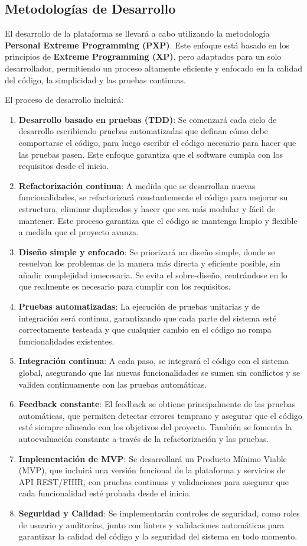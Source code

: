 \documentclass{article}
\begin{document}
\subsection{Metodologías de Desarrollo}
El desarrollo de la plataforma se llevará a cabo utilizando la metodología \textbf{Personal Extreme Programming (PXP)}. Este enfoque está basado en los principios de \textbf{Extreme Programming (XP)}, pero adaptados para un solo desarrollador, permitiendo un proceso altamente eficiente y enfocado en la calidad del código, la simplicidad y las pruebas continuas.

El proceso de desarrollo incluirá:
\begin{enumerate}[leftmargin=1.2em]
  \item \textbf{Desarrollo basado en pruebas (TDD)}: Se comenzará cada ciclo de desarrollo escribiendo pruebas automatizadas que definan cómo debe comportarse el código, para luego escribir el código necesario para hacer que las pruebas pasen. Este enfoque garantiza que el software cumpla con los requisitos desde el inicio.
  \item \textbf{Refactorización continua}: A medida que se desarrollan nuevas funcionalidades, se refactorizará constantemente el código para mejorar su estructura, eliminar duplicados y hacer que sea más modular y fácil de mantener. Este proceso garantiza que el código se mantenga limpio y flexible a medida que el proyecto avanza.
  \item \textbf{Diseño simple y enfocado}: Se priorizará un diseño simple, donde se resuelvan los problemas de la manera más directa y eficiente posible, sin añadir complejidad innecesaria. Se evita el sobre-diseño, centrándose en lo que realmente es necesario para cumplir con los requisitos.
  \item \textbf{Pruebas automatizadas}: La ejecución de pruebas unitarias y de integración será continua, garantizando que cada parte del sistema esté correctamente testeada y que cualquier cambio en el código no rompa funcionalidades existentes.
  \item \textbf{Integración continua}: A cada paso, se integrará el código con el sistema global, asegurando que las nuevas funcionalidades se sumen sin conflictos y se validen continuamente con las pruebas automáticas.
  \item \textbf{Feedback constante}: El feedback se obtiene principalmente de las pruebas automáticas, que permiten detectar errores temprano y asegurar que el código esté siempre alineado con los objetivos del proyecto. También se fomenta la autoevaluación constante a través de la refactorización y las pruebas.
  \item \textbf{Implementación de MVP}: Se desarrollará un Producto Mínimo Viable (MVP), que incluirá una versión funcional de la plataforma y servicios de API REST/FHIR, con pruebas continuas y validaciones para asegurar que cada funcionalidad esté probada desde el inicio.
  \item \textbf{Seguridad y Calidad}: Se implementarán controles de seguridad, como roles de usuario y auditorías, junto con linters y validaciones automáticas para garantizar la calidad del código y la seguridad del sistema en todo momento.
\end{enumerate}
\end{document}
